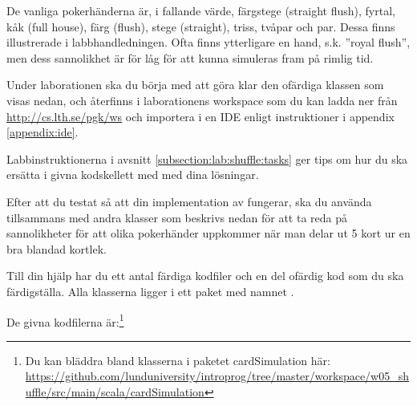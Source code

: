 De vanliga pokerhänderna är, i fallande värde, färgstege (straight flush), fyrtal, kåk (full house), färg (flush), stege (straight), triss, tvåpar och par. Dessa finns illustrerade i labbhandledningen.
Ofta finns ytterligare en hand, s.k. ''royal flush'', men dess sannolikhet är för låg för att kunna simuleras fram på rimlig tid.

Under laborationen ska du börja med att göra klar den ofärdiga klassen  som visas nedan, och återfinns i laborationens workspace som du kan ladda ner från \url{http://cs.lth.se/pgk/ws} och importera i en IDE enligt instruktioner i appendix \ref{appendix:ide}.


\noindent Labbinstruktionerna i avsnitt \ref{subsection:lab:shuffle:tasks} ger tips om hur du ska ersätta  i givna kodskellett med med dina lösningar.

Efter att du testat så att din implementation av  fungerar, ska du använda  tillsammans med andra klasser som beskrivs nedan för att ta reda på sannolikheter för att olika pokerhänder uppkommer när man delar ut 5 kort ur en bra  blandad kortlek.

Till din hjälp har du ett antal färdiga kodfiler och en del ofärdig kod som du ska färdigställa. Alla klasserna ligger i ett paket med namnet .

De givna kodfilerna är:\footnote{Du kan bläddra bland klasserna i paketet cardSimulation här: \\
\href{https://github.com/lunduniversity/introprog/tree/master/workspace/w05_shuffle/src/main/scala/cardSimulation}{\mbox{\fontsize{9}{11}\selectfont  https://github.com/lunduniversity/introprog/tree/master/workspace/w05\_shuffle/src/main/scala/cardSimulation}}}

